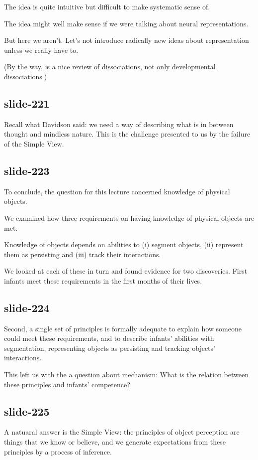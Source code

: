 \documentclass[12pt,\papersize]{extarticle}
\begin{document}
The idea is quite intuitive but difficult to make systematic sense of.
 
The idea might well make sense if we were talking about neural representations.
 
But here we aren't.  Let's not introduce radically new ideas about representation unless we really have to.
 
(By the way, \citet{Munakata:2001ch} is a nice review of dissociations, not only developmental dissociations.)
 
\subsection{slide-221}
Recall what Davidson said: we need a way of describing what is in between thought and 
mindless nature.  This is the challenge presented to us by the failure of the Simple View.
 
 
\subsection{slide-223}
To conclude, the question for this lecture concerned knowledge of physical objects.
 
We examined how three requirements on having knowledge of physical objects are met.
 
Knowledge of objects depends on abilities to (i) segment objects, (ii) represent them as persisting and (iii) track their interactions.
 
We looked at each of these in turn and found evidence for two discoveries.
First infants meet these requirements in the first months of their lives.
 
\subsection{slide-224}
Second, a single set of principles is formally adequate to explain how someone could 
meet these requirements, and to describe infants' abilities with segmentation, 
representing objects as persisting and tracking objects' interactions.
 
This left us with the a question about mechanism: What is the relation between these principles
and infants' competence?
 
\subsection{slide-225}
A natuaral answer is the Simple View: the principles of object perception are things that we know or believe, and we generate expectations from these principles by a process of inference.
 
\end{document}
